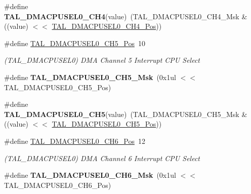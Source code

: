\begin{DoxyCompactItemize}
\item 
\hypertarget{group___s_a_m_l21___t_a_l_gaac47738bbb25441d1bcbc3a3887d8e92}{}\#define {\bfseries T\+A\+L\+\_\+\+D\+M\+A\+C\+P\+U\+S\+E\+L0\+\_\+\+C\+H4}(value)~(T\+A\+L\+\_\+\+D\+M\+A\+C\+P\+U\+S\+E\+L0\+\_\+\+C\+H4\+\_\+\+Msk \& ((value) $<$$<$ \hyperlink{group___s_a_m_l21___t_a_l_ga8ddad4cd1b4db541059bd957490ec276}{T\+A\+L\+\_\+\+D\+M\+A\+C\+P\+U\+S\+E\+L0\+\_\+\+C\+H4\+\_\+\+Pos}))\label{group___s_a_m_l21___t_a_l_gaac47738bbb25441d1bcbc3a3887d8e92}

\item 
\hypertarget{group___s_a_m_l21___t_a_l_ga897fab44e47f6a5951ae27a2cc870c46}{}\#define \hyperlink{group___s_a_m_l21___t_a_l_ga897fab44e47f6a5951ae27a2cc870c46}{T\+A\+L\+\_\+\+D\+M\+A\+C\+P\+U\+S\+E\+L0\+\_\+\+C\+H5\+\_\+\+Pos}~10\label{group___s_a_m_l21___t_a_l_ga897fab44e47f6a5951ae27a2cc870c46}

\begin{DoxyCompactList}\small\item\em (T\+A\+L\+\_\+\+D\+M\+A\+C\+P\+U\+S\+E\+L0) D\+M\+A Channel 5 Interrupt C\+P\+U Select \end{DoxyCompactList}\item 
\hypertarget{group___s_a_m_l21___t_a_l_ga91777c20c47a68dab02a191d121233eb}{}\#define {\bfseries T\+A\+L\+\_\+\+D\+M\+A\+C\+P\+U\+S\+E\+L0\+\_\+\+C\+H5\+\_\+\+Msk}~(0x1ul $<$$<$ T\+A\+L\+\_\+\+D\+M\+A\+C\+P\+U\+S\+E\+L0\+\_\+\+C\+H5\+\_\+\+Pos)\label{group___s_a_m_l21___t_a_l_ga91777c20c47a68dab02a191d121233eb}

\item 
\hypertarget{group___s_a_m_l21___t_a_l_ga51edf2e7819b320bb66a8814cae339db}{}\#define {\bfseries T\+A\+L\+\_\+\+D\+M\+A\+C\+P\+U\+S\+E\+L0\+\_\+\+C\+H5}(value)~(T\+A\+L\+\_\+\+D\+M\+A\+C\+P\+U\+S\+E\+L0\+\_\+\+C\+H5\+\_\+\+Msk \& ((value) $<$$<$ \hyperlink{group___s_a_m_l21___t_a_l_ga897fab44e47f6a5951ae27a2cc870c46}{T\+A\+L\+\_\+\+D\+M\+A\+C\+P\+U\+S\+E\+L0\+\_\+\+C\+H5\+\_\+\+Pos}))\label{group___s_a_m_l21___t_a_l_ga51edf2e7819b320bb66a8814cae339db}

\item 
\hypertarget{group___s_a_m_l21___t_a_l_ga2d76e9c7a8321e8cb4babd7b00950371}{}\#define \hyperlink{group___s_a_m_l21___t_a_l_ga2d76e9c7a8321e8cb4babd7b00950371}{T\+A\+L\+\_\+\+D\+M\+A\+C\+P\+U\+S\+E\+L0\+\_\+\+C\+H6\+\_\+\+Pos}~12\label{group___s_a_m_l21___t_a_l_ga2d76e9c7a8321e8cb4babd7b00950371}

\begin{DoxyCompactList}\small\item\em (T\+A\+L\+\_\+\+D\+M\+A\+C\+P\+U\+S\+E\+L0) D\+M\+A Channel 6 Interrupt C\+P\+U Select \end{DoxyCompactList}\item 
\hypertarget{group___s_a_m_l21___t_a_l_ga8642df51331651717a336c42f05d8419}{}\#define {\bfseries T\+A\+L\+\_\+\+D\+M\+A\+C\+P\+U\+S\+E\+L0\+\_\+\+C\+H6\+\_\+\+Msk}~(0x1ul $<$$<$ T\+A\+L\+\_\+\+D\+M\+A\+C\+P\+U\+S\+E\+L0\+\_\+\+C\+H6\+\_\+\+Pos)\label{group___s_a_m_l21___t_a_l_ga8642df51331651717a336c42f05d8419}


\end{DoxyCompactItemize}
